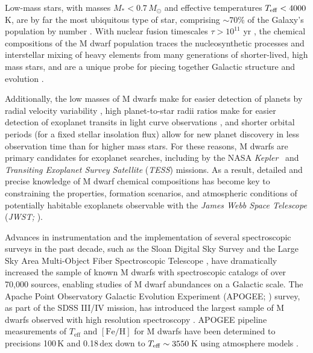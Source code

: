 \documentclass[twocolumn]{aastex62}
\newcommand{\kepler}{\textsl{Kepler}}
\newcommand{\tess}{\textsl{TESS}}
\newcommand{\msun}{M_{\odot}}
\newcommand{\teff}{T_{\mathrm{eff}}}
\newcommand{\feh}{[{\mathrm{Fe}/\mathrm{H}}]}
\begin{document}
Low-mass stars, with masses $M_{*} < 0.7\,\msun$ and effective temperatures $T_{\rm eff} < 4000\,$K, are by far the most ubiquitous type of star, comprising $\sim 70 \%$ of the Galaxy's population by number \citep{Bochanski:2010}. With nuclear fusion timescales $\tau>10^{11}$ yr \citep{Laughlin:1997}, the chemical compositions of the M dwarf population traces the nucleosynthetic processes and interstellar mixing of heavy elements from many generations of shorter-lived, high mass stars, and are a unique probe for piecing together Galactic structure and evolution \citep{Bochanski:2010,Woolf:2012}.  

Additionally, the low masses of M dwarfs make for easier detection of planets by radial velocity variability \citep{Trifonov:2018}, high planet-to-star radii ratios make for easier detection of exoplanet transits in light curve observations \citep{Nutzman:2008}, and shorter orbital periods (for a fixed stellar insolation flux) allow for new planet discovery in less observation time than for higher mass stars. For these reasons, M dwarfs are primary candidates for exoplanet searches, including by the NASA \kepler\ \citep[e.g.,][]{Dressing2015} and \textsl{Transiting Exoplanet Survey Satellite} (\tess) \citep[e.g.,][]{Muirhead:2018} missions. As a result, detailed and precise knowledge of M dwarf chemical compositions has become key to constraining the properties, formation scenarios, and atmospheric conditions of potentially habitable exoplanets observable with the \textsl{James Webb Space Telescope} ({\sl JWST;} \citealt{Clampin2008}). 

Advances in instrumentation and the implementation of several spectroscopic surveys in the past decade, such as the Sloan Digital Sky Survey \citep[SDSS;][]{Eisenstein:2011,Blanton:2017} and the Large Sky Area Multi-Object Fiber Spectroscopic Telescope \citep[LAMOST;][]{Zhao:2012}, have dramatically increased the sample of known M dwarfs \citep{West:2011,Guo:2015} with spectroscopic catalogs of over 70,000 sources, enabling studies of M dwarf abundances on a Galactic scale.
The Apache Point Observatory Galactic Evolution Experiment (APOGEE; \citealt{Majewski:2015}) survey, as part of the SDSS III/IV mission, has introduced the largest sample of M dwarfs observed with high resolution spectroscopy \citep{Desphande:2013}. APOGEE pipeline measurements of $\teff$ and $\feh$ \citep{Perez:2016} for M dwarfs have been determined to precisions 100\,K and 0.18\,dex down to $T_{\rm eff}\sim3550\,$K using atmosphere models \citep{Schmidt:2016}. 
\end{document}

